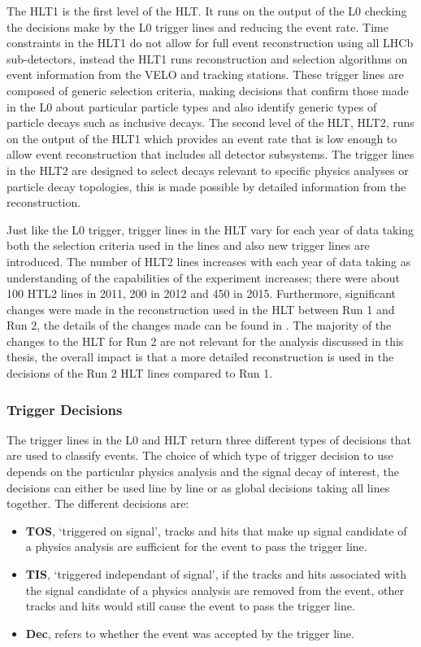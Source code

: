 The HLT1 is the first level of the HLT. It runs on the output of the L0 checking the decisions make by the L0 trigger lines and reducing the event rate. %
Time constraints in the HLT1 do not allow for full event reconstruction using all LHCb sub-detectors, instead the HLT1 runs reconstruction and selection algorithms on event information from the VELO and tracking stations. These trigger lines are composed of generic selection criteria, making decisions that confirm those made in the L0 about particular particle types and also identify generic types of particle decays such as inclusive \bhadron decays. The second level of the HLT, HLT2, runs on the output of the HLT1 which provides an event rate that is low enough to allow event reconstruction that includes all detector subsystems. The trigger lines in the HLT2 are designed to select decays relevant to specific physics analyses or particle decay topologies, this is made possible by detailed information from the reconstruction. 

Just like the L0 trigger, trigger lines in the HLT vary for each year of data taking both the selection criteria used in the lines and also new trigger lines are introduced. The number of HLT2 lines increases with each year of data taking as understanding of the capabilities of the experiment increases; there were about 100 HTL2 lines in 2011, 200 in 2012 and 450 in 2015. Furthermore, significant changes were made in the reconstruction used in the HLT between Run 1 and Run 2,  the details of the changes made can be found in \cite{Lupton:2230910}. The majority of the changes to the HLT for Run 2 are not relevant for the analysis discussed in this thesis, the overall impact is that a more detailed reconstruction is used in the decisions of the Run 2 HLT lines compared to Run 1.


\subsubsection{Trigger Decisions}
\label{trigger_decisions}
The trigger lines in the L0 and HLT return three different types of decisions that are used to classify events. The choice of which type of trigger decision to use depends on the particular physics analysis and the signal decay of interest, the decisions can either be used line by line or as global decisions taking all lines together. The different decisions are:
\begin{itemize}
\item {\bf TOS}, `triggered on signal', tracks and hits that make up signal candidate of a physics analysis are sufficient for the event to pass the trigger line. 
\item {\bf TIS}, `triggered independant of signal', if the tracks and hits associated with the signal candidate of a physics analysis are removed from the event, other tracks and hits would still cause the event to pass the trigger line.
\item {\bf Dec}, refers to whether the event was accepted by the trigger line.
\end{itemize}

